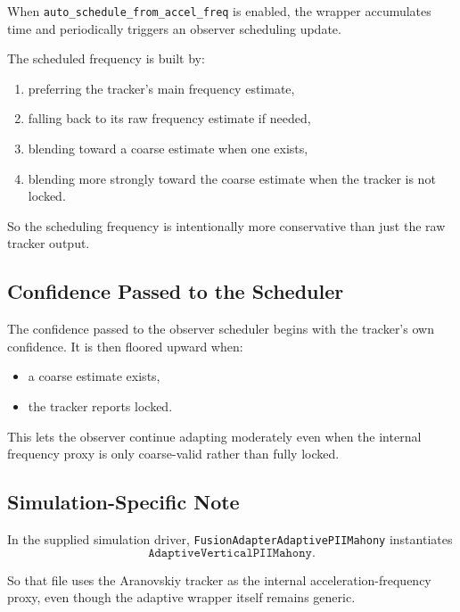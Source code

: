 \documentclass[conference]{IEEEtran}
\begin{document}
When \texttt{auto\_schedule\_from\_accel\_freq} is enabled, the wrapper
accumulates time and periodically triggers an observer scheduling update.

The scheduled frequency is built by:
\begin{enumerate}[leftmargin=1.5em]
  \item preferring the tracker’s main frequency estimate,
  \item falling back to its raw frequency estimate if needed,
  \item blending toward a coarse estimate when one exists,
  \item blending more strongly toward the coarse estimate when the tracker is
        not locked.
\end{enumerate}

So the scheduling frequency is intentionally more conservative than just the
raw tracker output.

\subsection{Confidence Passed to the Scheduler}

The confidence passed to the observer scheduler begins with the tracker’s own
confidence. It is then floored upward when:
\begin{itemize}[leftmargin=1.4em]
  \item a coarse estimate exists,
  \item the tracker reports locked.
\end{itemize}

This lets the observer continue adapting moderately even when the internal
frequency proxy is only coarse-valid rather than fully locked.

\subsection{Simulation-Specific Note}

In the supplied simulation driver,
\texttt{FusionAdapterAdaptivePIIMahony} instantiates
\begin{equation}
\texttt{AdaptiveVerticalPIIMahony}.
\end{equation}

So that file uses the Aranovskiy tracker as the internal acceleration-frequency
proxy, even though the adaptive wrapper itself remains generic.

\end{document}

